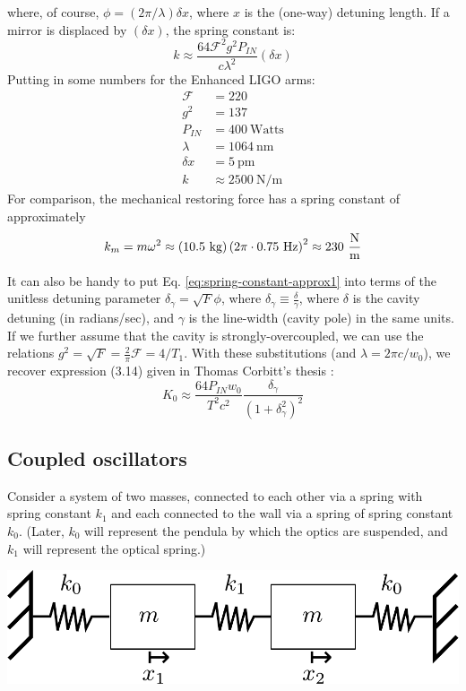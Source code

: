 where, of course, $\phi=(2\pi/\lambda)\delta x$, where $x$ is the
(one-way) detuning length. If a mirror is displaced by $(\delta x)$,
the spring constant is:
\[
k\approx\frac{64\mathcal{F}^{2}g^{2}P_{IN}}{c\lambda^{2}}\left(\delta x\right)
\]
Putting in some numbers for the Enhanced LIGO arms:
\begin{align*}
\mathcal{F} & =220\\
g^{2} & =137\\
P_{IN} & =400\mathrm{\ Watts}\\
\lambda & =1064\mathrm{\ nm}\\
\delta x & =5\mathrm{\ pm}\\
\hline k & \approx2500\mathrm{\ N/m}
\end{align*}
For comparison, the mechanical restoring force has a spring constant
of approximately
\[
k_{m}=m\omega^{2}\approx\left(10.5\text{ kg}\right)\left(2\pi\cdot0.7\text{5 Hz}\right)^{2}\approx230\text{ \ensuremath{\frac{\text{N}}{\text{m}}}}
\]


It can also be handy to put Eq. \ref{eq:spring-constant-approx1}
into terms of the unitless detuning parameter $\delta_{\gamma}=\sqrt{F}\phi$,
where $\delta_{\gamma}\equiv\frac{\delta}{\gamma}$, where $\delta$
is the cavity detuning (in radians/sec), and $\gamma$ is the line-width
(cavity pole) in the same units. If we further assume that the cavity
is strongly-overcoupled, we can use the relations $g^{2}=\sqrt{F}=\frac{2}{\pi}\mathcal{F}=4/T_{1}$.
With these substitutions (and $\lambda=2\pi c/w_{0}$), we recover
expression (3.14) given in Thomas Corbitt's thesis \cite{Corbitt2008Quantum}:
\begin{equation}
K_{0}\approx\frac{64P_{IN}w_{0}}{T^{2}c^{2}}\frac{\delta_{\gamma}}{\left(1+\delta_{\gamma}^{2}\right)^{2}}
\end{equation}


\subsection{Coupled oscillators}

Consider a system of two masses, connected to each other via a spring
with spring constant $k_{1}$ and each connected to the wall via a
spring of spring constant $k_{0}$. (Later, $k_{0}$ will represent
the pendula by which the optics are suspended, and $k_{1}$ will represent
the optical spring.)

\begin{center}
\includegraphics[width=0.4\paperwidth]{figures/coupled-oscillators-diagram}
\par\end{center}

